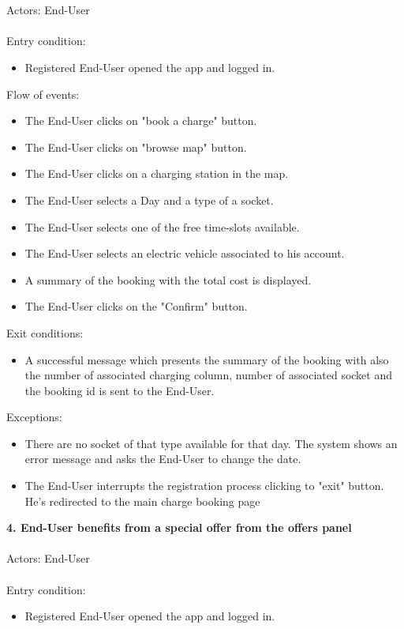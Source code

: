 \documentclass[a4paper]{report}
\begin{document}
\\
\\
Actors: End-User \\ \\
Entry condition:
\begin{itemize}
\item Registered End-User opened the app and logged in.
\end{itemize}
Flow of events:
\begin{itemize}
\item The End-User clicks on "book a charge" button.
\item The End-User clicks on "browse map" button.
\item The End-User clicks on a charging station in the map.
\item The End-User selects a Day and a type of a socket.
\item The End-User selects one of the free time-slots available.
\item The End-User selects an electric vehicle associated to his account.
\item A summary of the booking with the total cost is displayed.
\item The End-User clicks on the "Confirm" button.
\end{itemize}
Exit conditions:
\begin{itemize}
\item A successful message which presents the summary of the booking with also the number of associated charging column, number of associated socket and the booking id is sent to the End-User.
 \end{itemize}
Exceptions: 
 \begin{itemize}
 \item There are no socket of that type available for that day. The system shows an error message and asks the End-User to change the date.
 \item The End-User interrupts the registration process clicking to "exit" button. He's redirected to the main charge booking page
\end{itemize}
\textbf{4. End-User benefits from a special offer from the offers panel}\label{uc:5}
\\ \\
Actors: End-User \\ \\
Entry condition:
\begin{itemize}
\item Registered End-User opened the app and logged in.
\end{itemize}
\end{document}

